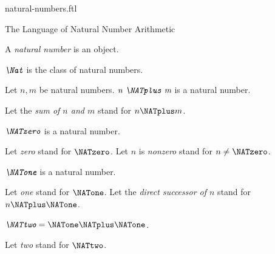\documentclass{naproche-library}
\begin{document}
\begin{smodule}[title=Natural Numbers]{natural-numbers.ftl}

\begin{sfragment}{The Language of Natural Number Arithmetic}
  \begin{signature}[forthel,id=ARITHMETIC_01_3074681254969344]
    A \emph{natural number} is an object.
  \end{signature}

  \begin{definition}[forthel,id=ARITHMETIC_01_7367148418629632]
    $\emph{\Nat}$ is the class of natural numbers.
  \end{definition}

  \begin{signature}[forthel,id=ARITHMETIC_01_1567933815848960]
    Let $n, m$ be natural numbers.
    $\emph{n \NATplus m}$ is a natural number.

    Let the \emph{sum of $n$ and $m$} stand for $n \NATplus m$.
  \end{signature}

  \begin{signature}[forthel,id=ARITHMETIC_01_7633304715001856]
    $\emph{\NATzero}$ is a natural number.

    Let \emph{zero} stand for $\NATzero$.
    Let $n$ is \emph{nonzero} stand for $n \neq \NATzero$.
  \end{signature}

  \begin{signature}[forthel,id=ARITHMETIC_01_1200254566985232]
    $\emph{\NATone}$ is a natural number.

    Let \emph{one} stand for $\NATone$.
    Let the \emph{direct successor of $n$} stand for $n \NATplus \NATone$.
  \end{signature}

  \begin{definition}[forthel,id=ARITHMETIC_01_4584236572999680]
    $\emph{\NATtwo} = \NATone \NATplus \NATone$.

    Let \emph{two} stand for $\NATtwo$.
  \end{definition}


\end{sfragment}
\end{smodule}
\end{document}
